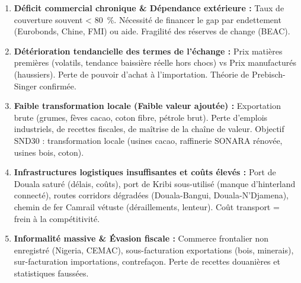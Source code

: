 \documentclass[11pt]{article}
\newcommand{\cle}[1]{{\popxbold\color{popdark}#1}}
\begin{document}
\begin{aretenir}
\begin{enumerate}
\item \textbf{Déficit commercial chronique \& Dépendance extérieure :} Taux de couverture souvent \SI{< 80}{\%}. Nécessité de financer le gap par endettement (Eurobonds, Chine, FMI) ou aide. Fragilité des réserves de change (BEAC).
\item \textbf{Détérioration tendancielle des termes de l'échange :} Prix matières premières (volatils, tendance baissière réelle hors chocs) vs Prix manufacturés (haussiers). Perte de pouvoir d'achat à l'importation. Théorie de Prebisch-Singer confirmée.
\item \textbf{Faible transformation locale (Faible valeur ajoutée) :} Exportation brute (grumes, fèves cacao, coton fibre, pétrole brut). Perte d'emplois industriels, de recettes fiscales, de maîtrise de la chaîne de valeur. Objectif SND30 : \cle{transformation locale} (usines cacao, raffinerie SONARA rénovée, usines bois, coton).
\item \textbf{Infrastructures logistiques insuffisantes et coûts élevés :} Port de Douala saturé (délais, coûts), port de Kribi sous-utilisé (manque d'hinterland connecté), routes corridors dégradées (Douala-Bangui, Douala-N'Djamena), chemin de fer Camrail vétuste (déraillements, lenteur). Coût transport = frein à la compétitivité.
\item \textbf{Informalité massive \& Évasion fiscale :} Commerce frontalier non enregistré (Nigeria, CEMAC), sous-facturation exportations (bois, minerais), sur-facturation importations, contrefaçon. Perte de recettes douanières et statistiques faussées.
\end{enumerate}
\end{aretenir}
\end{document}
